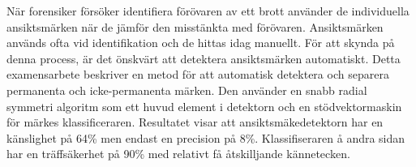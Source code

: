 
När  forensiker  försöker identifiera förövaren av ett brott använder de individuella ansiktsmärken när de jämför den misstänkta med förövaren. Ansiktsmärken används ofta vid identifikation och de hittas idag manuellt. För att skynda på denna process, är det önskvärt att detektera ansiktsmärken automatiskt. Detta examensarbete beskriver en metod för att automatisk detektera och separera permanenta och icke-permanenta märken. Den använder en snabb radial symmetri  algoritm som ett huvud element i detektorn och en stödvektormaskin för märkes klassificeraren. Resultatet visar att ansiktsmäkedetektorn har en känslighet på 64\% men endast en precision på 8\%. Klassifiseraren å andra sidan har en träffsäkerhet på 90\% med relativt få åtskilljande kännetecken. 